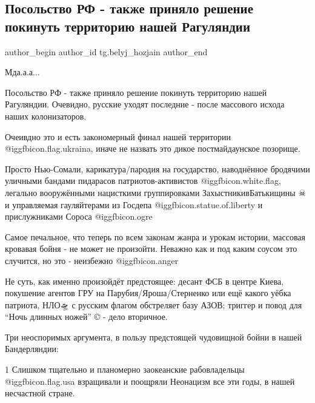  
 
 
 
 
 
\subsection{Посольство РФ - также приняло решение покинуть территорию нашей Рагуляндии}
\label{sec:12_02_2022.tg.belyj_hozjain.1.posolstvo_rf_raguljandia}
 
\ifcmt
 author_begin
   author_id tg.belyj_hozjain
 author_end
\fi

Мда.а.а...

Посольство РФ - также приняло решение покинуть территорию нашей Рагуляндии.
Очевидно, русские уходят последние - после массового исхода наших
колонизаторов.

Очеивдно это и есть закономерный финал нашей территории
@igg{fbicon.flag.ukraina}, иначе не назвать это дикое постмайдаунское позорище.

Просто Нью-Сомали, карикатура/пародия на государство, наводнённое бродячими
уличными бандами пидарасов патриотов-активистов @igg{fbicon.white.flag}, легально вооружёнными
нацисткими группировками ЗахыстникивБатькищины ☠ ️  и управляемая гауляйтерами
из Госдепа @igg{fbicon.statue.of.liberty}  и прислужниками Сороса @igg{fbicon.ogre} 

Самое печальное, что теперь по всем законам жанра и урокам истории, массовая
кровавая бойня - не может не произойти.  Неважно как и под каким соусом это
случится, но это - неизбежно @igg{fbicon.anger} 

Не суть, как именно произойдёт предстоящее: десант ФСБ в центре Киева,
покушение агентов ГРУ на Парубия/Яроша/Стерненко или ещё какого уёбка патриота,
НЛО🛸 с русским флагом обстреляет базу АЗОВ; триггер и повод для \enquote{Ночь длинных
ножей} © - дело вторичное.

Три неоспоримых аргумента, в пользу предстоящей чудовищной бойни в нашей
Бандерляндии:

1 Слишком тщательно и планомерно заокеанские рабовладельцы
@igg{fbicon.flag.usa} взращивали и поощряли Неонацизм все эти годы, в нашей
несчастной стране.

